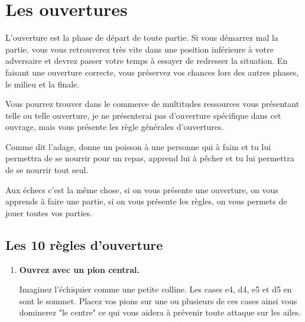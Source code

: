 \documentclass[a5paper,openany,twocolumn]{book}
\begin{document}
{\section{Les ouvertures}

L'ouverture est la phase de départ de toute partie. Si vous démarrez mal la partie, vous vous retrouverez très vite dans une position inférieure à votre adversaire et devrez passer votre temps à essayer de redresser la situation. En faisant une ouverture correcte, vous préservez vos chances lors des autres phases, le milieu et la finale.

Vous pourrez trouver dans le commerce de multitudes ressources vous présentant telle ou telle ouverture, je ne présenterai pas d'ouverture spécifique dans cet ouvrage, mais vous présente les règle générales d'ouvertures. 

Comme dit l'adage, donne un poisson à une personne qui à faim et tu lui permettra de se nourrir pour un repas, apprend lui à pêcher et tu lui permettra de se nourrir tout seul.

Aux échecs c'est la même chose, si on vous présente une ouverture, on vous apprends à faire une partie, si on vous présente les règles, on vous permets de jouer toutes vos parties. 

\subsection{Les 10 règles d'ouverture}

\medskip

\begin{enumerate}


\item \qquad \textbf{Ouvrez avec un pion central.}

\medskip

\qquad Imaginez l'échiquier comme une petite colline. Les cases e4, d4, e5 et d5 en sont le sommet. Placez vos pions sur une ou plusieurs de ces cases ainsi vous dominerez "le centre" ce qui vous aidera à prévenir toute attaque sur les ailes. \\


\end{enumerate}}
\end{document}
